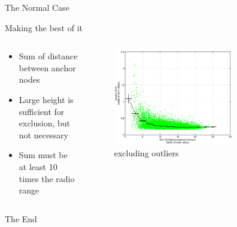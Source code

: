 \documentclass{beamer}
\begin{document}
\begin{frame}{The Normal Case}
\begin{block}{Making the best of it}
\begin{columns}
	\begin{column}{0.3\textwidth}
		\begin{itemize}
			\item Sum of distance between anchor nodes
			\item Large height is sufficient for exclusion, but not necessary
			\item Sum must be at least 10 times the radio range
		\end{itemize}
		\vfil
	\end{column}
	\begin{column}{0.7\textwidth}
		\begin{figure}
		  \centering
			\includegraphics[width=0.7\textwidth]{SumOfDistanceIndicator_square}
			\caption{excluding outliers}
		\end{figure}
	\end{column}
\end{columns}
\end{block}
\end{frame}

\begin{frame}
\centerline{The End}
\end{frame}
\end{document}
